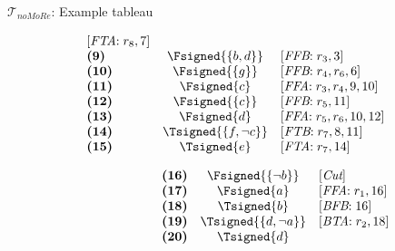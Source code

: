 \begin{frame}{$\mathcal{T}_{\textit{noMoRe}}$: Example tableau}
\begin{center}
\begin{minipage}[t]{16cm}
\begin{minipage}[t]{4.5cm}
\[\begin{array}{lcl}
  [\textit{FTA}{:}\;r_8, \text{7}]                 \\
\textbf{(9)}                                       &
  \Fsigned{\{b,d\}}                                &
  [\textit{FFB}{:}\;r_3, \text{3}]                 \\
\textbf{(10)}                                      &
  \Fsigned{\{g\}}                                  &
  [\textit{FFB}{:}\;r_4, r_6, \text{6}]            \\
\textbf{(11)}                                      &
  \Fsigned{c}                                      &
  [\textit{FFA}{:}\;r_3,r_4, \text{9}, \text{10}]  \\
\textbf{(12)}                                      &
  \Fsigned{\{c\}}                                  &
  [\textit{FFB}{:}\;r_5, \text{11}]                \\
\textbf{(13)}                                      &
  \Fsigned{d}                                      &
  [\textit{FFA}{:}\;r_5,r_6, \text{10}, \text{12}] \\
\textbf{(14)}                                      &
  \Tsigned{\{f,\neg c\}}                   &
  [\textit{FTB}{:}\;r_7, \text{8}, \text{11}]      \\
\textbf{(15)}                                      &
  \Tsigned{e}                                      &
  [\textit{FTA}{:}\;r_7, \text{14}]
\end{array}
\]
\end{minipage}
\begin{minipage}[t]{6cm}
\[
\hspace{2.2cm}
\begin{array}{lcl}
\textbf{(16)}                                      &
  \Fsigned{\{\neg b\}}                     &
  [\textit{Cut}]                                   \\
\textbf{(17)}                                      &
  \Fsigned{a}                                      &
  [\textit{FFA}{:}\; r_1, \text{16}]               \\
\textbf{(18)}                                      &
  \Tsigned{b}                                      &
  [\textit{BFB}{:}\; \text{16}]                    \\
\textbf{(19)}                                      &
  \Tsigned{\{d,\neg a\}}                   &
  [\textit{BTA}{:}\;r_2, \text{18}]                \\
\textbf{(20)}                                      &
  \Tsigned{d}                                      &

\end{array}\]
\end{minipage}
\end{minipage}
\end{center}
\end{frame}
